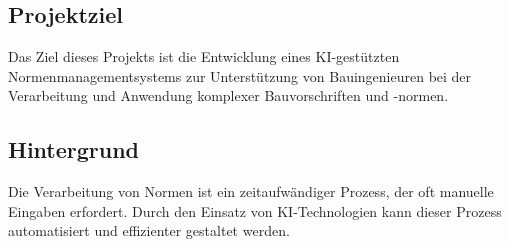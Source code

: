 \subsection{Projektziel}
Das Ziel dieses Projekts ist die Entwicklung eines KI-gestützten Normenmanagementsystems zur Unterstützung von Bauingenieuren bei der Verarbeitung und Anwendung komplexer Bauvorschriften und -normen.

\subsection{Hintergrund}
Die Verarbeitung von Normen ist ein zeitaufwändiger Prozess, der oft manuelle Eingaben erfordert. Durch den Einsatz von KI-Technologien kann dieser Prozess automatisiert und effizienter gestaltet werden.
